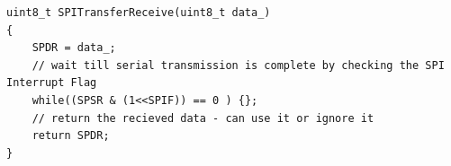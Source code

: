 \documentclass{article}
\begin{document}
\begin{verbatim}
uint8_t SPITransferReceive(uint8_t data_)
{
    SPDR = data_;
    // wait till serial transmission is complete by checking the SPI Interrupt Flag
    while((SPSR & (1<<SPIF)) == 0 ) {};
    // return the recieved data - can use it or ignore it
    return SPDR;
}
\end{verbatim}
\end{document}

